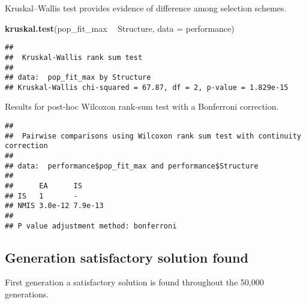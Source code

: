 \documentclass[]{book}
\newenvironment{Shaded}{\begin{snugshade}}{\end{snugshade}}
\newcommand{\DataTypeTok}[1]{\textcolor[rgb]{0.13,0.29,0.53}{#1}}
\newcommand{\KeywordTok}[1]{\textcolor[rgb]{0.13,0.29,0.53}{\textbf{#1}}}
\newcommand{\NormalTok}[1]{#1}
\newcommand{\OperatorTok}[1]{\textcolor[rgb]{0.81,0.36,0.00}{\textbf{#1}}}
\newcommand{\OtherTok}[1]{\textcolor[rgb]{0.56,0.35,0.01}{#1}}
\newcommand{\StringTok}[1]{\textcolor[rgb]{0.31,0.60,0.02}{#1}}
\begin{document}
Kruskal--Wallis test provides evidence of difference among selection schemes.

\begin{Shaded}
\begin{Highlighting}[]
\KeywordTok{kruskal.test}\NormalTok{(pop_fit_max }\OperatorTok{~}\StringTok{ }\NormalTok{Structure, }\DataTypeTok{data =}\NormalTok{ performance)}
\end{Highlighting}
\end{Shaded}

\begin{verbatim}
## 
##  Kruskal-Wallis rank sum test
## 
## data:  pop_fit_max by Structure
## Kruskal-Wallis chi-squared = 67.87, df = 2, p-value = 1.829e-15
\end{verbatim}

Results for post-hoc Wilcoxon rank-sum test with a Bonferroni correction.

\begin{Shaded}
\end{Shaded}

\begin{verbatim}
## 
##  Pairwise comparisons using Wilcoxon rank sum test with continuity correction 
## 
## data:  performance$pop_fit_max and performance$Structure 
## 
##      EA      IS     
## IS   1       -      
## NMIS 3.0e-12 7.9e-13
## 
## P value adjustment method: bonferroni
\end{verbatim}

\hypertarget{generation-satisfactory-solution-found-14}{%
\subsection{Generation satisfactory solution found}\label{generation-satisfactory-solution-found-14}}

First generation a satisfactory solution is found throughout the 50,000 generations.
\end{document}
